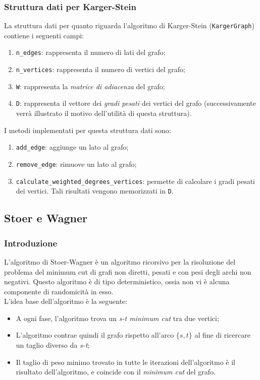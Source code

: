 \subsubsection{Struttura dati per Karger-Stein}
\label{struttura_dati_karger_stein}
La struttura dati per quanto riguarda l'algoritmo di Karger-Stein (\verb|KargerGraph|) contiene i seguenti campi:
\begin{enumerate}
  \item \verb|n_edges|: rappresenta il numero di lati del grafo;
  \item \verb|n_vertices|: rappresenta il numero di vertici del grafo;
  \item \verb|W|: rappresenta la \textit{matrice di adiacenza} del grafo;
  \item \verb|D|: rappresenta il vettore dei \textit{gradi pesati} dei vertici del grafo (successivamente verrà illustrato 
  il motivo dell'utilità di questa struttura).
\end{enumerate}

I metodi implementati per questa struttura dati sono:
\begin{enumerate}
  \item \verb|add_edge|: aggiunge un lato al grafo;
  \item \verb|remove_edge|: rimuove un lato al grafo;
  \item \label{calculate_weighted_degrees_vertices} \verb|calculate_weighted_degrees_vertices|: permette di calcolare i gradi pesati dei vertici. Tali risultati vengono 
  memorizzati in \verb|D|.
\end{enumerate}

\subsection{Stoer e Wagner}

\subsubsection{Introduzione}

L'algoritmo di Stoer-Wagner è un algoritmo ricorsivo per la risoluzione del problema del minimum cut di grafi non diretti, pesati e con pesi degli archi non negativi. Questo algoritmo è di tipo deterministico, ossia non vi è alcuna componente di randomicità in esso. \\
L'idea base dell'algoritmo è la seguente: 
\begin{itemize}
  \item A ogni fase, l'algoritmo trova un \textit{s-t minimum cut} tra due vertici;
  \item L'algoritmo contrae quindi il grafo rispetto all'arco $\{s,t\}$ al fine di ricercare un taglio diverso da \textit{s-t};
  \item Il taglio di peso minimo trovato in tutte le iterazioni dell'algoritmo è il risultato dell'algoritmo, e coincide con il \textit{minimum cut} del grafo.
\end{itemize}

